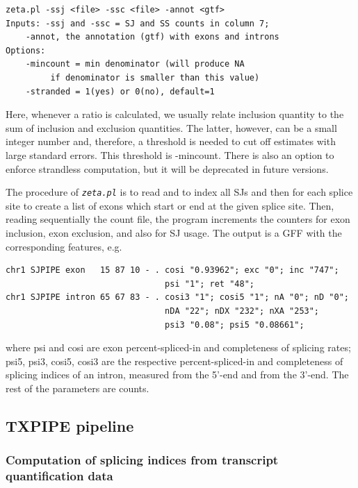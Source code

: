 \documentclass{article}
\newcommand{\prog}[1]{{\tt\em #1}}
\begin{document}
\begin{verbatim}
zeta.pl -ssj <file> -ssc <file> -annot <gtf>
Inputs:	-ssj and -ssc = SJ and SS counts in column 7;
	-annot, the annotation (gtf) with exons and introns
Options:
	-mincount = min denominator (will produce NA 
         if denominator is smaller than this value)
	-stranded = 1(yes) or 0(no), default=1
\end{verbatim}
Here, whenever a ratio is calculated, we usually relate inclusion quantity to the sum of inclusion and exclusion quantities. The latter, however, can be a 
small integer number and, therefore, a threshold is needed to cut off estimates with large standard errors. This threshold is -mincount. There is also an option 
to enforce strandless computation, but it will be deprecated in future versions.

The procedure of \prog{zeta.pl} is to read and to index all SJs and then for each splice site to create a list of exons which start or end at the given splice site. 
Then, reading sequentially the count file, the program increments the counters for exon inclusion, exon exclusion, and also for SJ usage. The output is a GFF with 
the corresponding features, e.g.
\begin{verbatim}
chr1 SJPIPE exon   15 87 10 - . cosi "0.93962"; exc "0"; inc "747"; 
                                psi "1"; ret "48";
chr1 SJPIPE intron 65 67 83 - . cosi3 "1"; cosi5 "1"; nA "0"; nD "0"; 
                                nDA "22"; nDX "232"; nXA "253"; 
                                psi3 "0.08"; psi5 "0.08661";
\end{verbatim}
where psi and cosi are exon percent-spliced-in and completeness of splicing rates; psi5, psi3, cosi5, cosi3 
are the respective percent-spliced-in and completeness of splicing indices of an intron, measured from the 
5'-end and from the 3'-end. The rest of the parameters are counts.


\subsection{TXPIPE pipeline}
\label{sec::txpipe}
\subsubsection[Splicing indices from transcript quantification data]{Computation of splicing indices from transcript quantification data}
\end{document}
